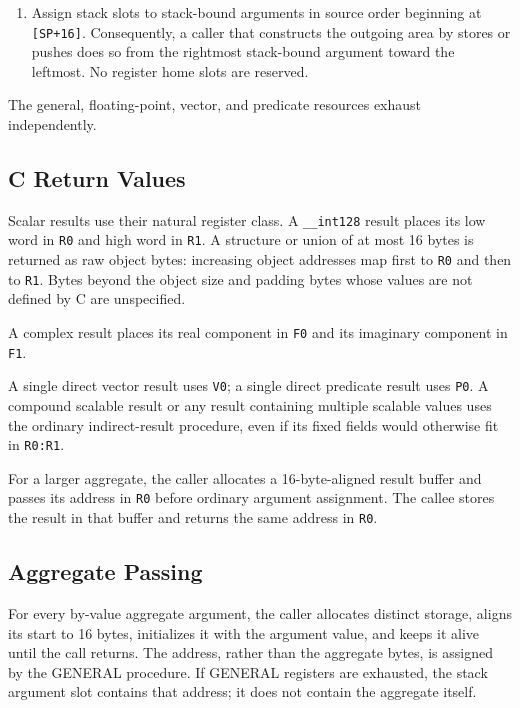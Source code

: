 \documentclass[10pt,twoside]{article}
\begin{document}
\begin{enumerate}[leftmargin=1.35em,itemsep=3pt,topsep=3pt]
forced to stack slots and do not consume register cursors. Apply the default
argument promotions before assigning those slots.
Every scalable argument in either case is first converted to INDIRECT. Its
GENERAL pointer is then subject to this forced-stack rule, so the variadic slot
contains the pointer, not the scalable object.
\item Assign stack slots to stack-bound arguments in source order beginning at
\texttt{[SP+16]}. Consequently, a caller that constructs the outgoing area by
stores or pushes does so from the rightmost stack-bound argument toward the
leftmost. No register home slots are reserved.
\end{enumerate}

The general, floating-point, vector, and predicate resources exhaust
independently.

\subsection{C Return Values}
Scalar results use their natural register class. A \texttt{\_\_int128} result
places its low word in \texttt{R0} and high word in \texttt{R1}. A structure
or union of at most 16 bytes is returned as raw object bytes: increasing object
addresses map first to \texttt{R0} and then to \texttt{R1}. Bytes beyond the
object size and padding bytes whose values are not defined by C are
unspecified.

A complex result places its real component in \texttt{F0} and its imaginary
component in \texttt{F1}.

A single direct vector result uses \texttt{V0}; a single direct predicate
result uses \texttt{P0}. A compound scalable result or any result containing
multiple scalable values uses the ordinary indirect-result procedure, even if
its fixed fields would otherwise fit in \texttt{R0:R1}.

For a larger aggregate, the caller allocates a 16-byte-aligned result buffer
and passes its address in \texttt{R0} before ordinary argument assignment. The
callee stores the result in that buffer and returns the same address in
\texttt{R0}.




\subsection{Aggregate Passing}
For every by-value aggregate argument, the caller allocates distinct storage,
aligns its start to 16 bytes, initializes it with the argument value, and keeps
it alive until the call returns. The address, rather than the aggregate bytes,
is assigned by the GENERAL procedure. If GENERAL registers are exhausted, the
stack argument slot contains that address; it does not contain the aggregate
itself.
\end{document}
